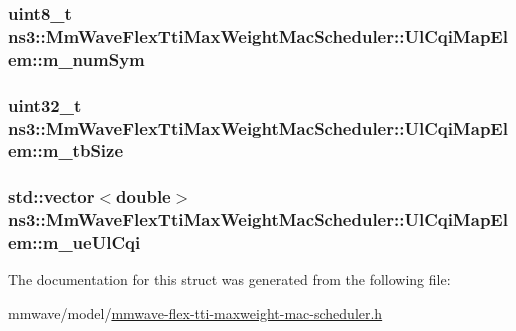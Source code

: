\subsubsection[{\texorpdfstring{m\+\_\+num\+Sym}{m_numSym}}]{\setlength{\rightskip}{0pt plus 5cm}uint8\+\_\+t ns3\+::\+Mm\+Wave\+Flex\+Tti\+Max\+Weight\+Mac\+Scheduler\+::\+Ul\+Cqi\+Map\+Elem\+::m\+\_\+num\+Sym}\hypertarget{structns3_1_1MmWaveFlexTtiMaxWeightMacScheduler_1_1UlCqiMapElem_ade92870b313c644f2c45b0878f3f5702}{}\label{structns3_1_1MmWaveFlexTtiMaxWeightMacScheduler_1_1UlCqiMapElem_ade92870b313c644f2c45b0878f3f5702}
\subsubsection[{\texorpdfstring{m\+\_\+tb\+Size}{m_tbSize}}]{\setlength{\rightskip}{0pt plus 5cm}uint32\+\_\+t ns3\+::\+Mm\+Wave\+Flex\+Tti\+Max\+Weight\+Mac\+Scheduler\+::\+Ul\+Cqi\+Map\+Elem\+::m\+\_\+tb\+Size}\hypertarget{structns3_1_1MmWaveFlexTtiMaxWeightMacScheduler_1_1UlCqiMapElem_a7ed023f010906081a2dd11c5301c5f40}{}\label{structns3_1_1MmWaveFlexTtiMaxWeightMacScheduler_1_1UlCqiMapElem_a7ed023f010906081a2dd11c5301c5f40}
\subsubsection[{\texorpdfstring{m\+\_\+ue\+Ul\+Cqi}{m_ueUlCqi}}]{\setlength{\rightskip}{0pt plus 5cm}std\+::vector$<$double$>$ ns3\+::\+Mm\+Wave\+Flex\+Tti\+Max\+Weight\+Mac\+Scheduler\+::\+Ul\+Cqi\+Map\+Elem\+::m\+\_\+ue\+Ul\+Cqi}\hypertarget{structns3_1_1MmWaveFlexTtiMaxWeightMacScheduler_1_1UlCqiMapElem_ab58a19edd95d0c68a3fba979a21c6c83}{}\label{structns3_1_1MmWaveFlexTtiMaxWeightMacScheduler_1_1UlCqiMapElem_ab58a19edd95d0c68a3fba979a21c6c83}


The documentation for this struct was generated from the following file\+:\begin{DoxyCompactItemize}
\item 
mmwave/model/\hyperlink{mmwave-flex-tti-maxweight-mac-scheduler_8h}{mmwave-\/flex-\/tti-\/maxweight-\/mac-\/scheduler.\+h}\end{DoxyCompactItemize}
